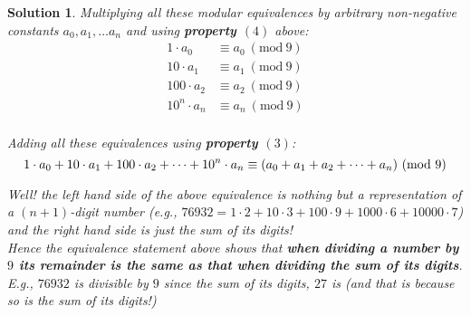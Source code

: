 \documentclass{article}
\newtheorem*{solution*}{Solution}
\newcommand{\Mod}[1]{\ (\mathrm{mod}\ #1)}
\begin{document}
\begin{solution*}
    Multiplying all these modular equivalences by arbitrary
    non-negative constants $a_0, a_1, \dots a_n$ and using
    \textbf{property $(4)$} above:
    \begin{align*}
        1\cdot{a_0} &\equiv a_0 \Mod 9\\
        10\cdot{a_1} &\equiv a_1 \Mod 9\\
        100\cdot{a_2} &\equiv a_2 \Mod 9\\
        10^n\cdot{a_n} &\equiv a_n \Mod 9\\
    \end{align*}

    Adding all these equivalences using \textbf{property $(3)$}:
    \begin{equation*}
        1\cdot{a_0} + 10\cdot{a_1} + 100\cdot{a_2} + \dots + 10^n\cdot{a_n} 
        \equiv
        (a_0 + a_1 + a_2 + \dots + a_n) \Mod 9\\
    \end{equation*}

    Well! the left hand side of the above equivalence is nothing
    but a representation of a $(n+1)$-digit number 
    (e.g., $76932 = 
    1\cdot{2} + 10\cdot{3} + 100\cdot{9} + 1000\cdot{6} + 10000\cdot{7}$)
    and the right hand side is just the sum of its digits!\\

    Hence the equivalence statement above shows that 
    \textbf{when dividing a number by $9$ its remainder 
    is the same as that when dividing the sum of its digits}.\\

    E.g., $76932$ is divisible by $9$
    since the sum of its digits, $27$ is (and that is because 
    so is the sum of its digits!)
\end{solution*}
\end{document}
